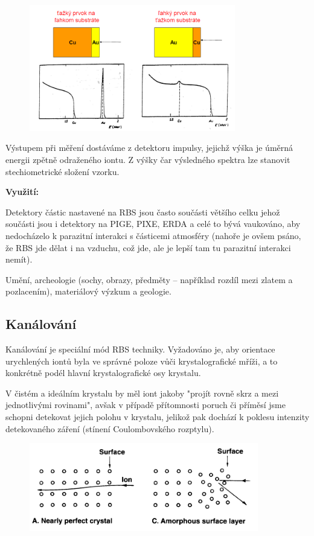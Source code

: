 \begin{figure}[H]
    \centering
	\includegraphics[width=9cm]{img/rbs-analyza.png}
\end{figure}

Výstupem při měření dostáváme z detektoru impulsy, jejichž výška je úměrná energii zpětně odraženého iontu. Z výšky čar výsledného spektra lze stanovit stechiometrické složení vzorku.

\textbf{Využití:}

Detektory částic nastavené na RBS jsou často součásti většího celku jehož součásti jsou i detektory na PIGE, PIXE, ERDA a celé to bývá vaukováno, aby nedocházelo k parazitní interakci s částicemi atmosféry (nahoře je ovšem psáno, že RBS jde dělat i na vzduchu, což jde, ale je lepší tam tu parazitní interakci nemít).

Umění, archeologie (sochy, obrazy, předměty -- například rozdíl mezi zlatem a pozlacením), materiálový výzkum a geologie.

\subsection{Kanálování}

Kanálování je speciální mód RBS techniky. Vyžadováno je, aby orientace urychlených iontů byla ve správné poloze vůči krystalografické mříži, a to konkrétně podél hlavní krystalografické osy krystalu.

V čistém a ideálním krystalu by měl iont jakoby "projít rovně skrz  a mezi jednotlivými rovinami", avšak v případě přítomnosti poruch či příměsí jsme schopni detekovat jejich polohu v krystalu, jelikož pak dochází k poklesu intenzity detekovaného záření (stínení Coulombovského rozptylu).

\begin{figure}[H]
    \centering
	\includegraphics[width=10cm]{img/rbs-kanalovani.png}
\end{figure}

